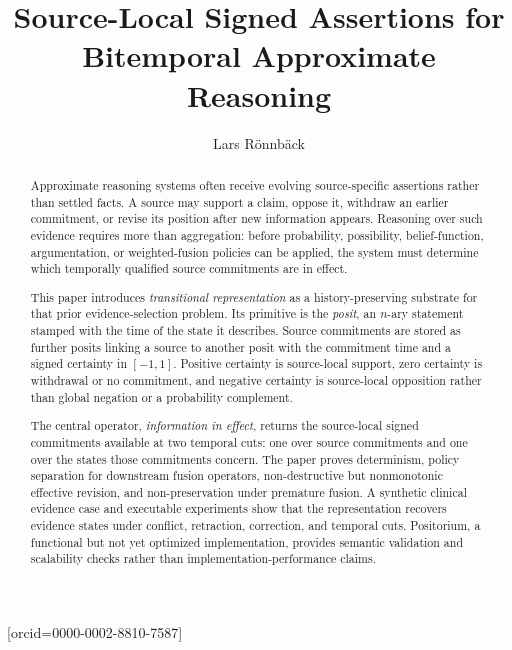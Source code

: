 \documentclass[a4paper,fleqn]{cas-sc}
\theoremstyle{plain}
\theoremstyle{remark}
\begin{document}
\let\WriteBookmarks\relax
\def\floatpagepagefraction{1}
\def\textpagefraction{.001}


\title[mode=title]{Source-Local Signed Assertions for Bitemporal Approximate Reasoning}

\author[1]{Lars R\"onnb\"ack}[orcid=0000-0002-8810-7587]
\cormark[1]

\begin{abstract}
Approximate reasoning systems often receive evolving source-specific assertions rather than settled facts. A source may support a claim, oppose it, withdraw an earlier commitment, or revise its position after new information appears. Reasoning over such evidence requires more than aggregation: before probability, possibility, belief-function, argumentation, or weighted-fusion policies can be applied, the system must determine which temporally qualified source commitments are in effect.

This paper introduces \emph{transitional representation} as a history-preserving substrate for that prior evidence-selection problem. Its primitive is the \emph{posit}, an \(n\)-ary statement stamped with the time of the state it describes. Source commitments are stored as further posits linking a source to another posit with the commitment time and a signed certainty in \([-1,1]\). Positive certainty is source-local support, zero certainty is withdrawal or no commitment, and negative certainty is source-local opposition rather than global negation or a probability complement.

The central operator, \emph{information in effect}, returns the source-local signed commitments available at two temporal cuts: one over source commitments and one over the states those commitments concern. The paper proves determinism, policy separation for downstream fusion operators, non-destructive but nonmonotonic effective revision, and non-preservation under premature fusion. A synthetic clinical evidence case and executable experiments show that the representation recovers evidence states under conflict, retraction, correction, and temporal cuts. Positorium, a functional but not yet optimized implementation, provides semantic validation and scalability checks rather than implementation-performance claims.
\end{abstract}
\end{document}
